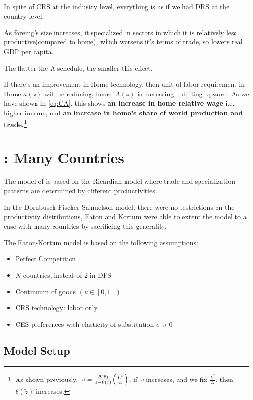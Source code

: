 \begin{note}
    \
    
    In spite of CRS at the industry level, everything is as if we had DRS at the country-level.

    As foreing's size increases, it specialized in sectors in which it is relatively less productive(compared to home),
    which worsens it's terms of trade, so lowers real GDP per capita.

    The flatter the A schedule, the smaller this effect.
\end{note}

If there's an improvement in Home technology, then unit of labor requirement in Home $a(z)$ will be reducing, hence $A(z)$ is increasing - shifting upward. 
As we have shown in \ref{eq:CA}, this shows \textbf{an increase in home relative wage} i.e. higher income, 
and \textbf{an increase in home's share of world production and trade.}\footnote{As shown previously, $\omega = \frac{\theta(\tilde{z})}{1-\theta(\tilde{z})} \Bigl(\frac{L^*}{L}\Bigr)$, 
if $\omega$ increases, and we fix $\frac{L^*}{L}$, then $\theta(\tilde{z})$ increases.} 

\section{\cite{eaton2002technology}: Many Countries}
The model of \cite{dornbusch1977comparative} is based on the Ricardian model
where trade and specialization patterns are determined by different productivities.

In the Dornbusch-Fischer-Samuelson model, there were no restrictions on the productivity distributions,
Eaton and Kortum were able to extent the model to a case with many countries by sacrificing this generality.

The Eaton-Kortum model is based on the following assumptions:
\begin{itemize}
    \item Perfect Competition
    \item $N$ countries, insteat of 2 in DFS
    \item Continuum of goods $(u \in [0,1])$
    \item CRS technology: labor only
    \item CES preferences with elasticity of substitution $\sigma > 0$
\end{itemize}

\subsection{Model Setup}

